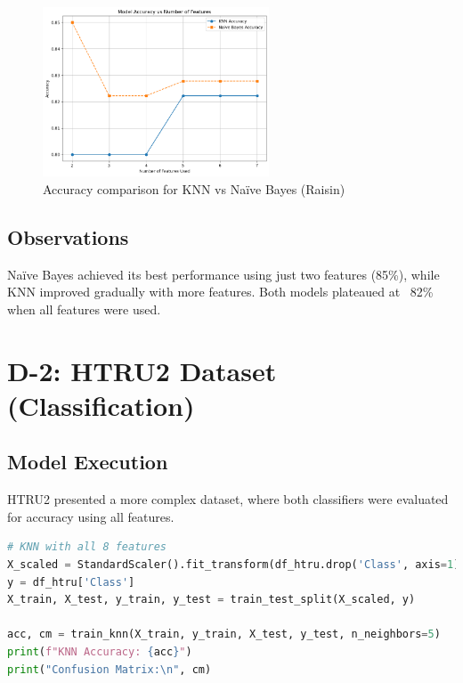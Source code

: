 \begin{figure}[H]
    \centering
    \includegraphics[width=0.6\textwidth]{figures/raisin_accuracy_plot.png}
    \caption{Accuracy comparison for KNN vs Naïve Bayes (Raisin)}
    \label{fig:raisin_accuracy}
\end{figure}

\subsection{Observations}
Naïve Bayes achieved its best performance using just two features (85\%), while KNN improved gradually with more features. Both models plateaued at ~82\% when all features were used.

\section{D-2: HTRU2 Dataset (Classification)}
\label{sec:results_htru2}

\subsection{Model Execution}

HTRU2 presented a more complex dataset, where both classifiers were evaluated for accuracy using all features.

\begin{lstlisting}[language=Python, caption={Confusion matrix for KNN on HTRU2}, label=list:htru2_cm]
# KNN with all 8 features
X_scaled = StandardScaler().fit_transform(df_htru.drop('Class', axis=1))
y = df_htru['Class']
X_train, X_test, y_train, y_test = train_test_split(X_scaled, y)

acc, cm = train_knn(X_train, y_train, X_test, y_test, n_neighbors=5)
print(f"KNN Accuracy: {acc}")
print("Confusion Matrix:\n", cm)
\end{lstlisting}

